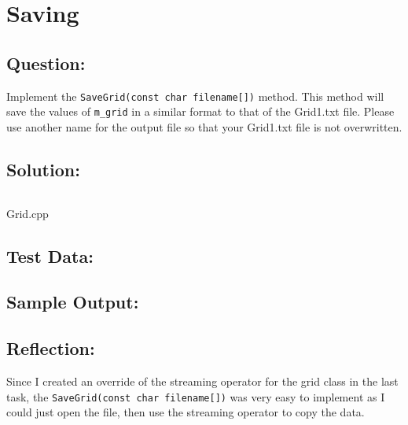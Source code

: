 \section{Saving}
    \subsection*{Question:}
        Implement the \texttt{SaveGrid(const char filename[])} method. 
        This method will save the values of \texttt{m_grid} in a similar 
        format to that of the Grid1.txt file. 
        Please use another name for the output file 
        so that your Grid1.txt file is not overwritten.
            
    \subsection*{Solution:}
        \begin{listing}[!ht]
            \inputminted[firstline=47, lastline=55]{cpp}{../Tasks/03-Saving/Grid.cpp}
            \caption{Grid.cpp}
        \end{listing}

    \subsection*{Test Data:}
        
    \subsection*{Sample Output:}

    \subsection*{Reflection:}
        Since I created an override of the streaming operator for the grid class 
        in the last task, the \texttt{SaveGrid(const char filename[])} was very easy
        to implement as I could just open the file, then use the streaming operator to copy
        the data.